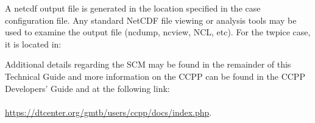 
A netcdf output file is generated in the location specified in the case
configuration file. Any standard NetCDF file viewing or analysis tools may be used to 
examine the output file (ncdump, ncview, NCL, etc).  For the twpice case, it is located in:


Additional details regarding the SCM may be found in the remainder of this Technical Guide and more information on the CCPP can be found in the CCPP Developers' Guide and at the following link: \\ \\
\url{https://dtcenter.org/gmtb/users/ccpp/docs/index.php}.







